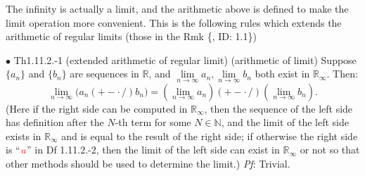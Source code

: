 \documentclass{article}
\begin{document}
\begin{Rmk}{}
    The infinity is actually a limit, and the arithmetic above is defined to make the limit operation more convenient. This is the following rules which extends the arithmetic of regular limits (those in the Rmk \{, ID: 1.1\})
\end{Rmk}

\begin{Th}{$\bullet$ Th1.11.2.-1 (extended arithmetic of regular limit) (arithmetic of limit)}
    Suppose $\{a_n\}$ and $\{b_n\}$ are sequences in $\mathbb{R}$, and $\lim\limits_{n\to\infty}a_n, \lim\limits_{n\to\infty}b_n$ both exist in $\mathbb{R}_\infty$. Then:
    $$ \lim\limits_{n\to\infty}\Big(a_n (+-\cdot\,/) b_n\Big) = \left(\lim\limits_{n\to\infty}a_n \right)(+-\cdot\,/) \left(\lim\limits_{n\to\infty}b_n\right). $$
    (Here if the right side can be computed in $\mathbb{R}_\infty$, then the sequence of the left side has definition after the $N$-th term for some $N\in\mathbb{N}$, and the limit of the left side exists in $\mathbb{R}_\infty$ and is equal to the result of the right side; if otherwise the right side is ``$\textcolor{red}{u}$'' in Df 1.11.2.-2, then the limit of the left side can exist in $\mathbb{R}_\infty$ or not so that other methods should be used to determine the limit.)
    \tcblower
    \textit{Pf}: Trivial.
\end{Th}
\end{document}
